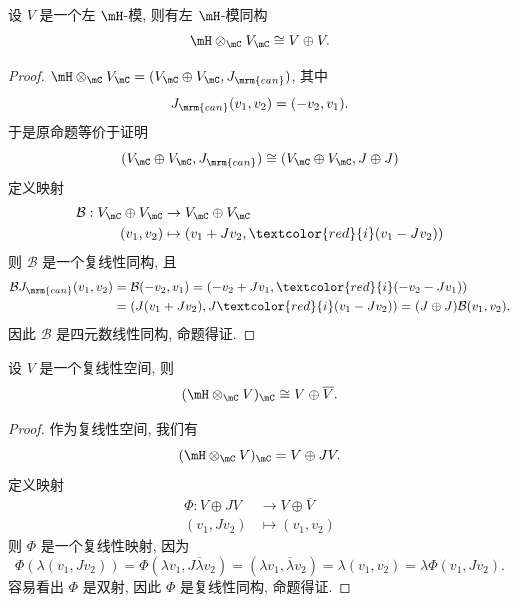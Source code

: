 \begin{proposition}
    设 $V$ 是一个左 $\mH$-模, 则有左 $\mH$-模同构
    \begin{equation*}
        \mH\otimes_{\mC} V_{\mC} \cong V\oplus V.
    \end{equation*}
\end{proposition}
\begin{proof}
    $\mH\otimes_{\mC} V_{\mC} = (V_{\mC}\oplus V_{\mC}, J_{\mrm{can}})$, 其中
    \begin{equation*}
        J_{\mrm{can}}(v_1,v_2) = (-v_2, v_1).
    \end{equation*}
    于是原命题等价于证明
    \begin{equation*}
        (V_{\mC}\oplus V_{\mC}, J_{\mrm{can}}) \cong (V_{\mC}\oplus V_{\mC}, J\oplus J)
    \end{equation*}
    定义映射
    \begin{align*}
        \mathcal{B}:V_{\mC}\oplus V_{\mC}&\rightarrow V_{\mC}\oplus V_{\mC} \\
        (v_1,v_2)&\mapsto (v_1 + Jv_2, \textcolor{red}{i}(v_1 - Jv_2))
    \end{align*}
    则 $\mathcal{B}$ 是一个复线性同构, 且
    \begin{align*}
        \mathcal{B}J_{\mrm{can}}(v_1,v_2) &= \mathcal{B}(-v_2, v_1) = (-v_2 + Jv_1, \textcolor{red}{i}(-v_2 - Jv_1)) \\
        &= (J(v_1 + Jv_2), J\textcolor{red}{i}(v_1 - Jv_2)) = (J\oplus J)\mathcal{B}(v_1,v_2).
    \end{align*}
    因此 $\mathcal{B}$ 是四元数线性同构, 命题得证.
\end{proof}
\begin{proposition}
    设 $V$ 是一个复线性空间, 则
    \begin{equation*}
        (\mH\otimes_{\mC} V)_{\mC} \cong V\oplus \overline{V}.
    \end{equation*}
\end{proposition}
\begin{proof}
    作为复线性空间, 我们有
    \begin{equation*}
        (\mH\otimes_{\mC} V)_{\mC} = V\oplus JV.
    \end{equation*}
    定义映射
    \begin{align*}
        \Phi:V\oplus JV&\rightarrow V\oplus \overline{V} \\
        (v_1, Jv_2)&\mapsto (v_1, v_2)
    \end{align*}
    则 $\Phi$ 是一个复线性映射, 因为
    \begin{equation*}
        \Phi(\lambda(v_1, Jv_2)) = \Phi(\lambda v_1, J\overline{\lambda}v_2) = (\lambda v_1, \overline{\lambda}v_2) = \lambda(v_1, v_2) = \lambda\Phi(v_1, Jv_2).
    \end{equation*}
    容易看出 $\Phi$ 是双射, 因此 $\Phi$ 是复线性同构, 命题得证.
\end{proof}